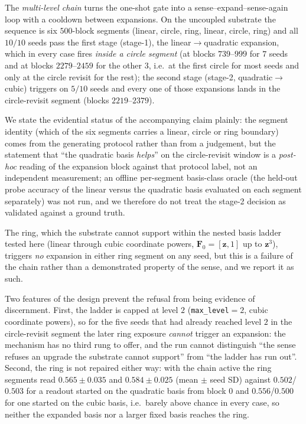 \documentclass[preprint,12pt]{elsarticle}
\begin{document}
The \emph{multi-level chain} turns the one-shot gate into a
sense--expand--sense-again loop with a cooldown between expansions. On the
uncoupled substrate the sequence is six $500$-block segments
(linear, circle, ring, linear, circle, ring) and all $10/10$ seeds pass the
first stage (stage-1), the linear$\to$quadratic expansion, which in every case
fires \emph{inside a circle segment} (at blocks $739$--$999$ for $7$ seeds and
at blocks $2279$--$2459$ for the other $3$, i.e.\ at the first circle for most
seeds and only at the circle revisit for the rest); the second stage
(stage-2, quadratic$\to$cubic) triggers on $5/10$ seeds and every one of those
expansions lands in the circle-revisit segment (blocks $2219$--$2379$).

We state the evidential status of the accompanying claim plainly: the segment
identity (which of the six segments carries a linear, circle or ring boundary)
comes from the generating protocol rather than from a judgement, but the
statement that ``the quadratic basis \emph{helps}'' on the circle-revisit
window is a \emph{post-hoc} reading of the expansion block against that
protocol label, not an independent measurement; an offline per-segment
basis-class oracle (the held-out probe accuracy of the linear versus the
quadratic basis evaluated on each segment separately) was not run, and we
therefore do not treat the stage-2 decision as validated against a ground
truth.

The ring, which
the substrate cannot support within the nested basis ladder tested here
(linear through cubic coordinate powers, $\mathbf F_0=[\mathbf z,1]$ up to
$\mathbf z^3$), triggers \emph{no} expansion in either ring segment on any
seed, but this is a failure of the chain rather than a demonstrated
property of the sense, and we report it as such.

Two features of the design
prevent the refusal from being evidence of discernment. First, the ladder is
capped at level $2$ (\texttt{max\_level}$=2$, cubic coordinate powers), so for
the five seeds that had already reached level $2$ in the circle-revisit
segment the later ring exposure \emph{cannot} trigger an expansion: the
mechanism has no third rung to offer, and the run cannot distinguish ``the
sense refuses an upgrade the substrate cannot support'' from ``the ladder has
run out''. Second, the ring is not repaired either way: with the chain active
the ring segments read $0.565\pm0.035$ and $0.584\pm0.025$ (mean $\pm$ seed SD)
against $0.502$/$0.503$ for a readout started on the quadratic basis from
block $0$ and $0.556$/$0.500$ for one started on the cubic basis, i.e.\ barely
above chance in every case, so neither the expanded basis nor a
larger fixed basis reaches the ring.
\end{document}
